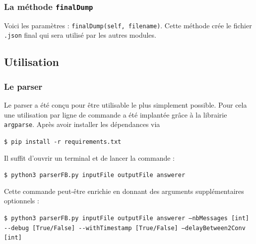 \documentclass[10pt,a4paper]{article}
\begin{document}
\subsubsection{La méthode \texttt{finalDump}}
Voici les paramètres : \texttt{finalDump(self, filename)}. Cette méthode crée le fichier \texttt{.json} final qui sera utilisé par les autres modules.

\subsection{Utilisation}
\subsubsection{Le parser}
Le parser a été conçu pour être utilisable le plus simplement possible. Pour cela une utilisation par ligne de commande a été implantée grâce à la librairie \texttt{argparse}. Après avoir installer les dépendances via
\begin{center}
	\texttt{\$ pip install -r requirements.txt}
\end{center}

Il suffit d'ouvrir un terminal et de lancer la commande :

\begin{center}
	\texttt{\$ python3 parserFB.py inputFile outputFile answerer}
\end{center}

Cette commande peut-être enrichie en donnant des arguments supplémentaires optionnels :

\begin{center}
	\texttt{\$ python3 parserFB.py inputFile outputFile answerer --nbMessages [int] -{}-debug [True/False] -{}-withTimestamp [True/False] --delayBetween2Conv [int]}
\end{center}
\end{document}
